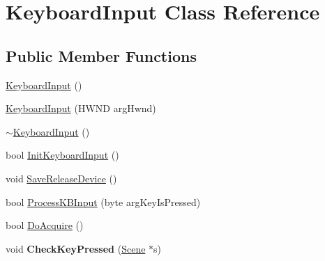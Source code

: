 \hypertarget{class_keyboard_input}{\section{Keyboard\-Input Class Reference}
\label{class_keyboard_input}
}
\subsection*{Public Member Functions}
\begin{DoxyCompactItemize}
\item 
\hyperlink{class_keyboard_input_a92d9c25232e73f2d9319c79df028cc69}{Keyboard\-Input} ()
\item 
\hyperlink{class_keyboard_input_a720b46c79dacb78a98f687d6bf96d8db}{Keyboard\-Input} (H\-W\-N\-D arg\-Hwnd)
\item 
\hyperlink{class_keyboard_input_a2aa6da03ad4f06f93a2a940ee59d05f9}{$\sim$\-Keyboard\-Input} ()
\item 
bool \hyperlink{class_keyboard_input_a003c3bec8752a73d19f42c25e27568d4}{Init\-Keyboard\-Input} ()
\item 
void \hyperlink{class_keyboard_input_a2b4b64f62cf405d182b0d368586f299c}{Save\-Release\-Device} ()
\item 
bool \hyperlink{class_keyboard_input_a00765a4bfa891e8d6e44433d6479571c}{Process\-K\-B\-Input} (byte arg\-Key\-Is\-Pressed)
\item 
bool \hyperlink{class_keyboard_input_a099ea8a6c5012b458483719473167d98}{Do\-Acquire} ()
\item 
\hypertarget{class_keyboard_input_a57f25c7d587c69f63c114fea28c407f9}{void {\bfseries Check\-Key\-Pressed} (\hyperlink{class_scene}{Scene} $\ast$s)}\label{class_keyboard_input_a57f25c7d587c69f63c114fea28c407f9}

\end{DoxyCompactItemize}


